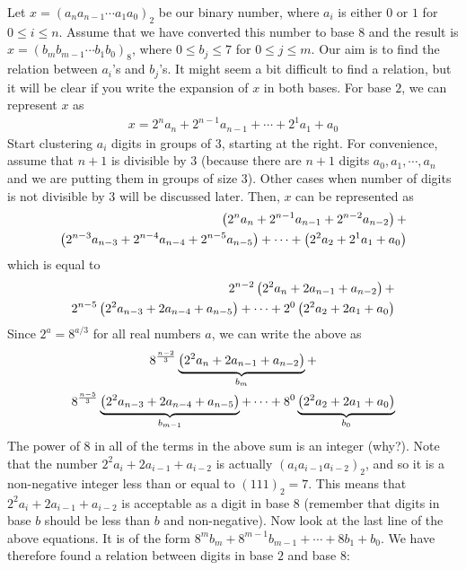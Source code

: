 Let $x = (a_{n}a_{n-1}\cdots a_1a_0)_2$ be our binary number, where $a_i$ is either $0$ or $1$ for $0\leq i \leq n$. Assume that we have converted this number to base $8$ and the result is $x = (b_{m}b_{m-1}\cdots b_1b_0)_8$, where $0\leq b_j \leq 7$ for $0 \leq j \leq m$. Our aim is to find the relation between $a_i$'s and $b_j$'s. It might seem a bit difficult to find a relation, but it will be clear if you write the expansion of $x$ in both bases. For base $2$, we can represent $x$ as
\begin{align*}
	x =  2^{n} a_{n} + 2^{n-1} a_{n-1} + \cdots + 2^1a_1 + a_0
\end{align*}
Start clustering $a_i$ digits in groups of $3$, starting at the right. For convenience, assume that $n+1$ is divisible by $3$ (because there are $n+1$ digits $a_0, a_1, \cdots, a_n$ and we are putting them in groups of size $3$). Other cases when number of digits is not divisible by $3$ will be discussed later. Then, $x$ can be represented as
\begin{align*}
 \left(2^{n} a_{n} + 2^{n-1} a_{n-1} + 2^{n-2} a_{n-2}\right) + \\ \left(2^{n-3}  a_{n-3} + 2^{n-4} a_{n-4} + 2^{n-5} a_{n-5}\right) +\cdots + \left(2^2a_2 + 2^1a_1 + a_0\right)
\end{align*}
which is equal to
\begin{align*}
	2^{n-2}\left(2^2 a_{n} + 2 a_{n-1} + a_{n-2}\right) + \\ 2^{n-5} \left(2^2 a_{n-3}  +  2 a_{n-4} + a_{n-5}\right)+  \cdots + 2^{0}\left(2^2a_2 + 2a_1 + a_0\right)
\end{align*}
Since $2^{a}=8^{a/3}$ for all real numbers $a$, we can write the above as
\begin{multline*}
  		8^{\frac{n-2}{3}} \underbrace{\left(2^2 a_{n} + 2 a_{n-1} + a_{n-2}\right)}_{b_m} + \\ 8^{\frac{n-5}{3}}  \underbrace{\left(2^2 a_{n-3} + 2 a_{n-4} + a_{n-5}\right)}_{b_{m-1}} + \cdots + 8^0 \underbrace{\left(2^2a_2 + 2a_1 + a_0\right)}_{b_0}
\end{multline*}
The power of $8$ in all of the terms in the above sum is an integer (why?). Note that the number $2^2 a_i + 2 a_{i-1} + a_{i-2}$ is actually $(a_{i}a_{i-1}a_{i-2})_2$, and so it is a non-negative integer less than or equal to $(111)_2 = 7$. This means that $2^2 a_i + 2 a_{i-1} + a_{i-2}$ is acceptable as a digit in base $8$ (remember that digits in base $b$ should be less than $b$ and non-negative). Now look at the last line of the above equations. It is of the form $8^m b_m + 8^{m-1}b_{m-1} + \cdots + 8b_1+b_0$. We have therefore found a relation between digits in base $2$ and base $8$:
